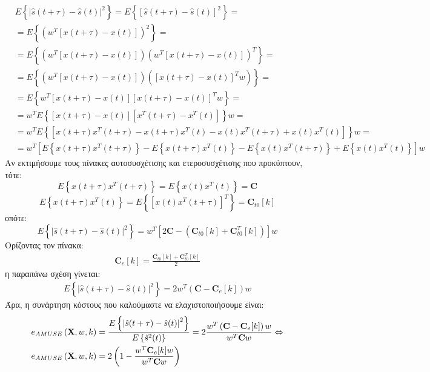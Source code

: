 \begin{align*}
&E \left \{ \left | \hat{s}(t+\tau) - \hat{s}(t) \right |^2  \right \} = E \left \{ \left [ \hat{s}(t+\tau)-\hat{s}(t) \right ]^2 \right \} = \\
&= E \left \{ \left ( w^T \left [ x(t+\tau) - x(t) \right ] \right )^2  \right \} = \\
& =E \left \{ \left ( w^T \left [ x(t+\tau) - x(t) \right ] \right ) \left ( w^T \left [ x(t+\tau) - x(t) \right ] \right )^T \right \} = \\
&=E \left \{ \left ( w^T \left [ x(t+\tau) - x(t) \right ] \right ) \left ( \left[ x(t+\tau)-x(t) \right ]^T w \right ) \right \} = \\
&=E \left \{  w^T \left [ x(t+\tau) - x(t) \right ]   \left[ x(t+\tau)-x(t) \right ]^T w \right \} = \\
&=w^T E\left \{ \left [ x(t+\tau) - x(t)\right ] \left [ x^T(t+\tau) - x^T(t) \right ]  \right \} w = \\
&=w^T E \left\{ \left [ x(t+\tau)x^T(t+\tau) - x(t+\tau)x^T(t) - x(t)x^T(t+\tau) + x(t)x^T(t) \right ] \right\}w = \\
&=w^T \left [ E \left \{x(t+\tau)x^T(t+\tau) \right \} -  E \left \{x(t+\tau)x^T(t) \right \} - E \left \{x(t)x^T(t+\tau) \right \} 
+ E \left \{x(t)x^T(t) \right \} \right] w
\end{align*}
Αν εκτιμήσουμε τους πίνακες αυτοσυσχέτισης και ετεροσυσχέτισης που προκύπτουν, τότε:
$$
E \left \{ x(t+\tau)x^T(t+\tau) \right\} = E \left \{ x(t)x^T(t) \right\} = \mathbf{C}
$$
$$
E \left \{ x(t+\tau)x^T(t) \right\} = E \left \{ \left [ x(t)x^T(t+\tau) \right ]^T \right\} = \mathbf{C}_{t0}[k]
$$
οπότε:
$$
E \left \{ \left | \hat{s}(t+\tau) - \hat{s}(t) \right |^2  \right \} = w^T \left [ 2\mathbf{C} - \left ( \mathbf{C}_{t0}[k] + \mathbf{C}^{T}_{t0}[k] \right )  \right ] w
$$
Ορίζοντας τον πίνακα:
\begin{align} \label{eq:2.4.1}
    \mathbf{C}_e[k] = \frac{\mathbf{C}_{t0}[k] + \mathbf{C}^T_{t0}[k]}{2}
\end{align}
η παραπάνω σχέση γίνεται:
\begin{align*}
    E \left \{ \left | \hat{s}(t+\tau) - \hat{s}(t) \right |^2  \right \} = 2w^T \left ( \mathbf{C} - \mathbf{C}_e[k]  \right ) w
\end{align*}
Άρα, η συνάρτηση κόστους που καλούμαστε να ελαχιστοποιήσουμε είναι:
\begin{align} \label{eq:2.4.2}
    &e_{AMUSE} \left ( \mathbf{X},w,k \right) = 
    \frac{ E \left \{ \left | \hat{s}(t+\tau) - \hat{s}(t) \right |^2 \right \} }{ E \left \{ \hat{s}^2(t) \right \} } = 2 \frac{w^T \left ( \mathbf{C} - \mathbf{C}_e[k] \right )w } { w^T \mathbf{C} w} \Leftrightarrow \notag \\
    &e_{AMUSE} \left ( \mathbf{X},w,k \right) = 2 \left ( 1 - \frac{w^T \mathbf{C}_e[k] w}{ w^T \mathbf{C}w} \right )
\end{align}

